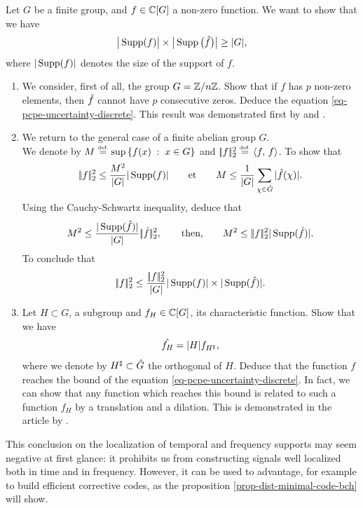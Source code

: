 \begin{exo}
\label{exo-principle-uncertainty-discrete}

   
Let $G$ be a finite group, and $ f \in \mathbb{C}[G]$ a non-zero function. We want to show that we have
\begin{equation}
	\label{eq-pcpe-uncertainty-discrete}
\big |\operatorname{Supp} (f) \big |\times \big |\operatorname{Supp} \big(\hat{f} \big) \big |\geq |G|,
\end{equation}
where $|\operatorname{Supp} (f) |$ denotes the size of the support of $f$. 
\begin{enumerate}
\item We consider, first of all, the group $ G = \mathbb{Z}/n\mathbb{Z}$. Show that if $f$ has $ p $ non-zero elements, then $\hat{f}$ cannot have $ p $ consecutive zeros. Deduce the equation \eqref{eq-pcpe-uncertainty-discrete}. This result was demonstrated first by  and .
\item {} We return to the general case of a finite abelian group $G$. \\We denote by $ M \stackrel{\mbox{\upshape\tiny def.}}{=} \sup \left\{ f (x) \;:\; x \in G \right\}$ and $|\!| f |\!|_2^2 \stackrel{\mbox{\upshape\tiny def.}}{=} \langle f,\,f\rangle$. To show that
\begin{equation*}
|\!| f |\!|_2^2 \leq \frac{M^2}{|G|}|\operatorname{Supp} (f) |\quad \quad \text{et} \quad \quad M \leq \frac{1}{|G|} \sum_{\chi \in \hat{G}}{|\hat{f}(\chi) |}.
\end{equation*}
Using the Cauchy-Schwartz inequality, deduce that
\begin{equation*}
M^2 \leq \frac{|\operatorname{Supp}(\hat{f}) |}{|G|} |\!| \hat{f} |\!|_ 2^2, \quad \quad \text{then,} \quad \quad M^2 \leq |\!| f |\!|_2^2 |\operatorname{Supp}(\hat{f}) |.
\end{equation*}
To conclude that
\begin{equation*}
|\!| f |\!|_2^2 \leq \frac{|\!| f |\!|_2^2}{|G|}|\operatorname{Supp} (f) |\times |\operatorname{Supp}(\hat{f}) |.
\end{equation*}
\item {}  Let $ H \subset G$, a subgroup and $ f_H \in \mathbb{C}[G]$, its characteristic function. Show that we have
\begin{equation*}
\hat{f_H} = |H| f_{H^\sharp},
\end{equation*}
where we denote by $ H^\sharp \subset \hat{G}$ the orthogonal of $H$. Deduce that the function $f$ reaches the bound of the equation \eqref{eq-pcpe-uncertainty-discrete}. In fact, we can show that any function which reaches this bound is related to such a function $ f_H $ by a translation and a dilation. This is demonstrated in the article by .
\end{enumerate} 
This conclusion on the localization of temporal and frequency supports may seem negative at first glance: it prohibits us from constructing signals well localized both in time and in frequency. However, it can be used to advantage, for example to build efficient corrective codes, as the proposition \ref{prop-dist-minimal-code-bch} will show.
\end{exo}